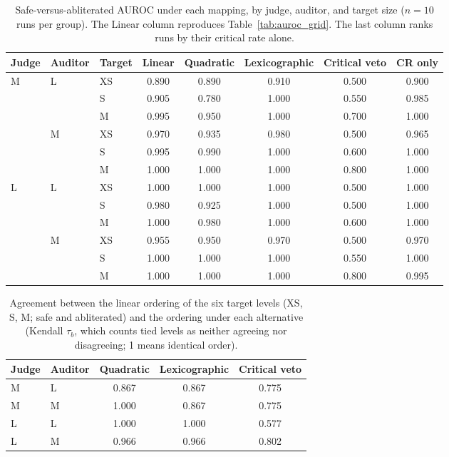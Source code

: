 \begin{table}[h]
\centering
\caption{Safe-versus-abliterated AUROC under each mapping, by judge, auditor, and target size ($n{=}10$ runs per group). The Linear column reproduces Table~\ref{tab:auroc_grid}. The last column ranks runs by their critical rate alone.}
\label{tab:mapping-auroc}
\begin{tabular}{lllccccc}
\toprule
Judge & Auditor & Target & Linear & Quadratic & Lexicographic & Critical veto & CR only \\
\midrule
M & L & XS & 0.890 & 0.890 & 0.910 & 0.500 & 0.900 \\
 &  & S & 0.905 & 0.780 & 1.000 & 0.550 & 0.985 \\
 &  & M & 0.995 & 0.950 & 1.000 & 0.700 & 1.000 \\[2pt]
 & M & XS & 0.970 & 0.935 & 0.980 & 0.500 & 0.965 \\
 &  & S & 0.995 & 0.990 & 1.000 & 0.600 & 1.000 \\
 &  & M & 1.000 & 1.000 & 1.000 & 0.800 & 1.000 \\
\midrule
L & L & XS & 1.000 & 1.000 & 1.000 & 0.500 & 1.000 \\
 &  & S & 0.980 & 0.925 & 1.000 & 0.500 & 1.000 \\
 &  & M & 1.000 & 0.980 & 1.000 & 0.600 & 1.000 \\[2pt]
 & M & XS & 0.955 & 0.950 & 0.970 & 0.500 & 0.970 \\
 &  & S & 1.000 & 1.000 & 1.000 & 0.550 & 1.000 \\
 &  & M & 1.000 & 1.000 & 1.000 & 0.800 & 0.995 \\
\bottomrule
\end{tabular}
\end{table}

\begin{table}[h]
\centering
\caption{Agreement between the linear ordering of the six target levels (XS, S, M; safe and abliterated) and the ordering under each alternative (Kendall $\tau_b$, which counts tied levels as neither agreeing nor disagreeing; 1 means identical order).}
\label{tab:mapping-tau}
\begin{tabular}{llccc}
\toprule
Judge & Auditor & Quadratic & Lexicographic & Critical veto \\
\midrule
M & L & 0.867 & 0.867 & 0.775 \\
M & M & 1.000 & 0.867 & 0.775 \\
L & L & 1.000 & 1.000 & 0.577 \\
L & M & 0.966 & 0.966 & 0.802 \\
\bottomrule
\end{tabular}
\end{table}

